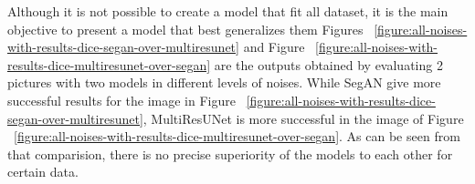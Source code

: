     

    

    

    


    Although it is not possible to create a model that fit all dataset, it is the main objective to present a model that best generalizes them
    Figures ~\ref{figure:all-noises-with-results-dice-segan-over-multiresunet} and Figure ~\ref{figure:all-noises-with-results-dice-multiresunet-over-segan}
    are the outputs obtained by evaluating 2 pictures with two models in different levels of noises.
    While SegAN give more successful results for the image in Figure ~\ref{figure:all-noises-with-results-dice-segan-over-multiresunet},
    MultiResUNet is more successful in the image of Figure ~\ref{figure:all-noises-with-results-dice-multiresunet-over-segan}.
    As can be seen from that comparision, there is no precise superiority of the models to each other for certain data.

